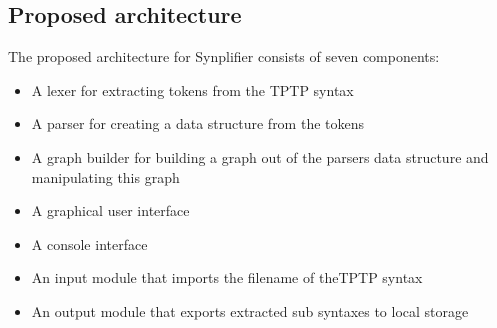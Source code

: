 \subsection{Proposed architecture}\label{sec:ConceptProposedArchitecture}
The proposed architecture for \ac{Synplifier} consists of seven components:
\begin{itemize}
\item A lexer for extracting tokens from the \ac{TPTP} syntax
\item A parser for creating a data structure from the tokens
\item A graph builder for building a graph out of the parsers data structure and manipulating this graph
\item A graphical user interface
\item A console interface 
\item An input module that imports the filename of the\ac{TPTP} syntax
\item An output module that exports extracted sub syntaxes to local storage
\end{itemize}


